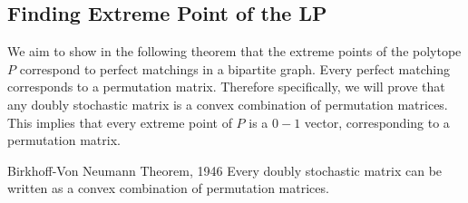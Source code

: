 \documentclass[twoside]{article}
\begin{document}
\subsection{Finding Extreme Point of the LP}
We aim to show in the following theorem that the extreme points of the polytope \( P \) correspond to perfect matchings in a bipartite graph. Every perfect matching corresponds to a permutation matrix. Therefore specifically, we will prove that any doubly stochastic matrix is a convex combination of permutation matrices. This implies that every extreme point of \( P \) is a \( 0-1 \) vector, corresponding to a permutation matrix.
\begin{Theorem}{Birkhoff-Von Neumann Theorem, 1946}{}
	Every doubly stochastic matrix can be written as a convex combination of permutation matrices.
\end{Theorem}
\end{document}
